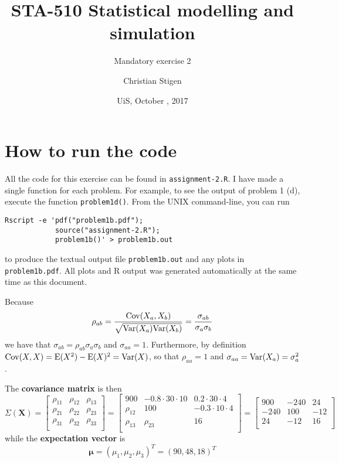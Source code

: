 \documentclass[a4paper,english,12pt]{article}
\title{STA-510 Statistical modelling and simulation}
\subtitle{Mandatory exercise 2}
\author{Christian Stigen}
\date{UiS, October \nth{19}, 2017}
\begin{document}
  \maketitle
\section*{\normalsize{How to run the code}}
All the code for this exercise can be found in \texttt{assignment-2.R}. I have
made a single function for each problem. For example, to see the output of
problem 1 (d), execute the function \texttt{problem1d()}.  From the UNIX
command-line, you can run
\begin{verbatim}
Rscript -e 'pdf("problem1b.pdf");
            source("assignment-2.R");
            problem1b()' > problem1b.out
\end{verbatim}
to produce the textual output file \texttt{problem1b.out} and any plots in
\texttt{problem1b.pdf}. All plots and R output was generated automatically at
the same time as this document.

\label{problem.1a}
Because
\begin{align*}
  \rho_{ab} &= \frac{\mathrm{Cov}(X_a, X_b)}{\sqrt{\mathrm{Var}(X_a)\mathrm{Var}(X_b)}} =
    \frac{\sigma_{ab}}{\sigma_a\sigma_b} \\
\end{align*}
we have that $\sigma_{ab} = \rho_{ab}\sigma_a\sigma_b$ and $\sigma_{aa} = 1$.
Furthermore, by definition $\mathrm{Cov}(X,X) = \mathrm{E}(X^2) - \mathrm{E}(X)^2 = \mathrm{Var}(X)$,
so that $\rho_{aa} = 1$ and $\sigma_{aa} = \mathrm{Var}(X_a) = \sigma_a^2$.

The \textbf{covariance matrix} is then
\[
  \Sigma\left(\textbf{X}\right) =
    \begin{bmatrix}
      \rho_{11} & \rho_{12} & \rho_{13} \\
      \rho_{21} & \rho_{22} & \rho_{23} \\
      \rho_{31} & \rho_{32} & \rho_{33} \\
    \end{bmatrix}
  =
    \begin{bmatrix}
      900 & -0.8 \cdot 30 \cdot 10 & 0.2 \cdot 30 \cdot 4 \\
      \rho_{12} & 100 & -0.3 \cdot 10 \cdot 4 \\
      \rho_{13} & \rho_{23} & 16 \\
    \end{bmatrix}
  =
    \begin{bmatrix}
       900 & -240 &  24 \\
      -240 &  100 & -12 \\
        24 &  -12 &  16 \\
    \end{bmatrix}
\]
while the \textbf{expectation vector} is
\[
  \bm{\mu} = \left( \mu_1 , \mu_2, \mu_3 \right)^T 
    = \left( 90, 48, 18 \right)^T
\]
\end{document}
